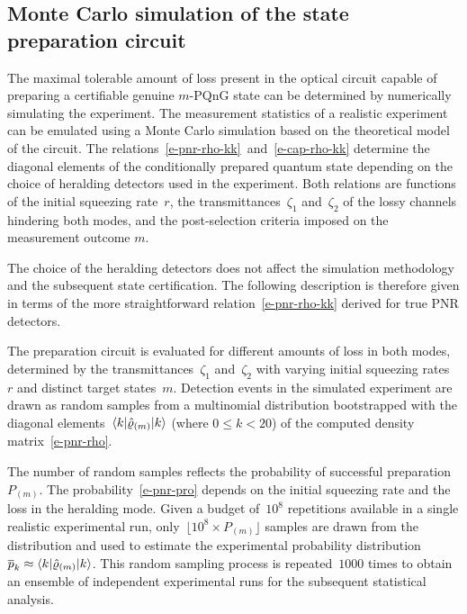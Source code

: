 \documentclass{article}
\begin{document}
\subsection*{Monte Carlo simulation of the state preparation circuit}

The maximal tolerable amount of loss present in the optical circuit capable of preparing a certifiable genuine $m$-PQnG state can be determined by numerically simulating the experiment. The measurement statistics of a realistic experiment can be emulated using a Monte Carlo simulation based on the theoretical model of the circuit. The relations~\eqref{e-pnr-rho-kk}~and~\eqref{e-cap-rho-kk} determine the diagonal elements of the conditionally prepared quantum state depending on the choice of heralding detectors used in the experiment. Both relations are functions of the initial squeezing rate~$r$, the transmittances~$\zeta_{1}$ and~$\zeta_{2}$ of the lossy channels hindering both modes, and the post-selection criteria imposed on the measurement outcome $m$.

The choice of the heralding detectors does not affect the simulation methodology and the subsequent state certification. The following description is therefore given in terms of the more straightforward relation~\eqref{e-pnr-rho-kk} derived for true PNR detectors.

The preparation circuit is evaluated for different amounts of loss in both modes, determined by the transmittances~$\zeta_{1}$ and~$\zeta_{2}$ with varying initial squeezing rates~$r$ and distinct target states~${m}$. Detection events in the simulated experiment are drawn as random samples from a multinomial distribution bootstrapped with the diagonal elements~$\braket{k|\hat{\varrho}_{(m)}|k}$ (where ${0 \leq k < 20}$) of the computed density matrix~\eqref{e-pnr-rho}. 

The number of random samples reflects the probability of successful preparation $P_{(m)}$. The probability~\eqref{e-pnr-pro} depends on the initial squeezing rate and the loss in the heralding mode. Given a budget of~$10^{8}$ repetitions available in a single realistic experimental run, only~${\lfloor 10^{8} \times P_{(m)} \rfloor}$ samples are drawn from the distribution and used to estimate the experimental probability distribution~${\overline{p}_{k} \approx \braket{k|\hat{\varrho}_{(m)}|k}}$. This random sampling process is repeated~$1000$ times to obtain an ensemble of independent experimental runs for the subsequent statistical analysis.
\end{document}
